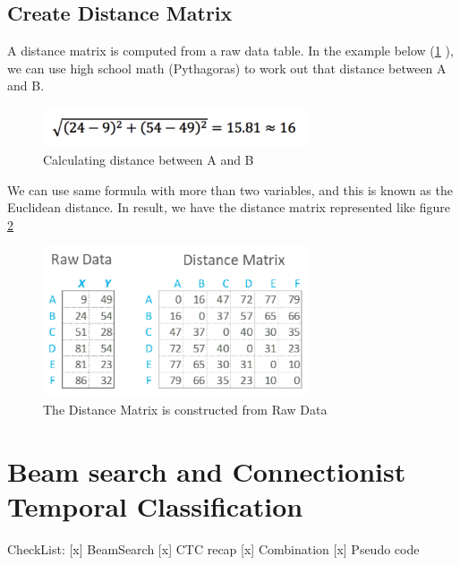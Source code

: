 
    \subsection{ Create Distance Matrix }
      A distance matrix is computed from a raw data table. In the example below (\ref{fig:Chap3-DM_Formula} ), we can use high school math (Pythagoras) to work out 
      that distance between A and B. 

      \begin{figure}[H]
        \centering
        \includegraphics[width=0.7\textwidth]{img/Chap3/DM_Formula}
        \caption{ Calculating distance between A and B}
        \label{fig:Chap3-DM_Formula}
      \end{figure}
      
      We can use same formula with more than two variables, and this is known as 
      the Euclidean distance.
      In result, we have the distance matrix represented like figure \ref{fig:Chap3-DM-Raw}
      \begin{figure}[H]
        \centering
        \includegraphics[width=0.7\textwidth]{img/Chap3/DM-Raw}
        \caption{ The Distance Matrix is constructed from Raw Data }
        \label{fig:Chap3-DM-Raw}
      \end{figure}
      
      \section{ Beam search and Connectionist Temporal Classification }
    CheckList:
      [x] BeamSearch
      [x] CTC recap
      [x] Combination
      [x] Pseudo code
